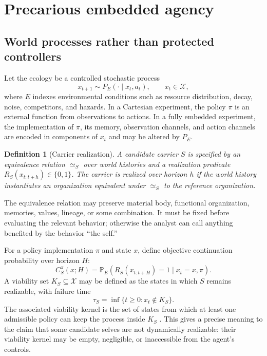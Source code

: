 \documentclass[11pt]{article}
\newtheorem{definition}{Definition}
\newcommand{\Pp}{\mathbb{P}}
\begin{document}
\section{Precarious embedded agency}

\subsection{World processes rather than protected controllers}

Let the ecology be a controlled stochastic process
\begin{equation}
 x_{t+1}\sim P_E(\cdot\mid x_t,a_t),
 \qquad x_t\in\mathcal X,
\label{eq:world}
\end{equation}
where $E$ indexes environmental conditions such as resource distribution, decay, noise, competitors, and hazards. In a Cartesian experiment, the policy $\pi$ is an external function from observations to actions. In a fully embedded experiment, the implementation of $\pi$, its memory, observation channels, and action channels are encoded in components of $x_t$ and may be altered by $P_E$.

\begin{definition}[Carrier realization]
A candidate carrier $S$ is specified by an equivalence relation $\simeq_S$ over world histories and a realization predicate $R_S(x_{t:t+h})\in\{0,1\}$. The carrier is realized over horizon $h$ if the world history instantiates an organization equivalent under $\simeq_S$ to the reference organization.
\end{definition}

The equivalence relation may preserve material body, functional organization, memories, values, lineage, or some combination. It must be fixed before evaluating the relevant behavior; otherwise the analyst can call anything benefited by the behavior ``the self.''

For a policy implementation $\pi$ and state $x$, define objective continuation probability over horizon $H$:
\begin{equation}
C_S^{\pi}(x;H)
=
\Pp_E\!\left(R_S(x_{t:t+H})=1\mid x_t=x,\pi\right).
\label{eq:objective-continuation}
\end{equation}
A viability set $K_S\subseteq\mathcal X$ may be defined as the states in which $S$ remains realizable, with failure time
\begin{equation}
\tau_S=\inf\{t\ge 0:x_t\notin K_S\}.
\label{eq:failure-time}
\end{equation}
The associated viability kernel is the set of states from which at least one admissible policy can keep the process inside $K_S$ \citep{aubin1991}. This gives a precise meaning to the claim that some candidate selves are not dynamically realizable: their viability kernel may be empty, negligible, or inaccessible from the agent's controls.
\end{document}
